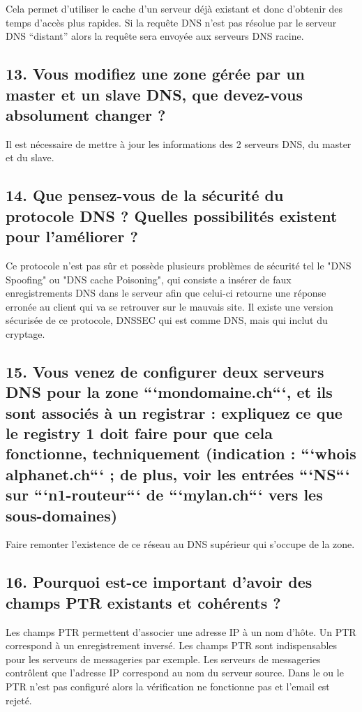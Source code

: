 \documentclass{article}
\begin{document}
Cela permet d'utiliser le cache d'un serveur déjà existant et donc d'obtenir des temps d'accès plus rapides. Si la requête DNS n'est pas résolue par le serveur DNS “distant” alors la requête sera envoyée aux serveurs DNS racine.

\subsection*{13. Vous modifiez une zone gérée par un master et un slave DNS, que devez-vous absolument changer ?}
Il est nécessaire de mettre à jour les informations des 2 serveurs DNS, du master et du slave.

\subsection*{14. Que pensez-vous de la sécurité du protocole DNS ? Quelles possibilités existent pour l’améliorer ?}
Ce protocole n'est pas sûr et possède plusieurs problèmes de sécurité tel le "DNS Spoofing" ou "DNS cache Poisoning", qui consiste a insérer de faux enregistrements DNS dans le serveur afin que celui-ci retourne une réponse erronée au client qui va se retrouver sur le mauvais site. Il existe une version sécurisée de ce protocole, DNSSEC qui est comme DNS, mais qui inclut du cryptage.

\subsection*{15. Vous venez de configurer deux serveurs DNS pour la zone ```mondomaine.ch```, et ils sont associés à un registrar : expliquez ce que le registry 1 doit faire pour que cela fonctionne, techniquement (indication : ```whois alphanet.ch``` ; de plus, voir les entrées ```NS``` sur ```n1-routeur``` de ```mylan.ch``` vers les sous-domaines)}
Faire remonter l'existence de ce réseau au DNS supérieur qui s'occupe de la zone.

\subsection*{16. Pourquoi est-ce important d’avoir des champs PTR existants et cohérents ?}
Les champs PTR permettent d'associer une adresse IP à un nom d'hôte. Un PTR correspond à un enregistrement inversé. Les champs PTR sont indispensables pour les serveurs de messageries par exemple.
Les serveurs de messageries contrôlent que l'adresse IP correspond au nom du serveur source. Dans le ou le PTR n'est pas configuré alors la vérification ne fonctionne pas et l'email est rejeté.
\end{document}
